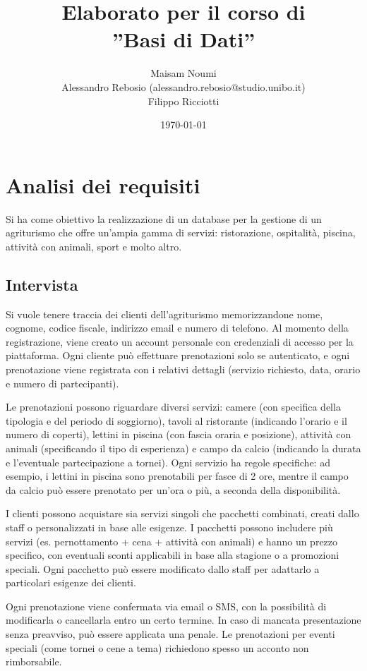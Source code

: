 \documentclass[a4paper,11pt]{report}
\title{Elaborato per il corso di\\''Basi di Dati''}
\author{
    Maisam Noumi\\
    Alessandro Rebosio (alessandro.rebosio@studio.unibo.it)\\
    Filippo Ricciotti
}
\date{\today}
\begin{document}
\maketitle

\tableofcontents

\chapter{Analisi dei requisiti}
Si ha come obiettivo la realizzazione di un database per la gestione di un agriturismo che offre un'ampia gamma di servizi: ristorazione,
ospitalità, piscina, attività con animali, sport e molto altro.

\section{Intervista}
Si vuole tenere traccia dei clienti dell'agriturismo memorizzandone nome, cognome, codice fiscale, indirizzo email e numero di telefono. Al
momento della registrazione, viene creato un account personale con credenziali di accesso per la piattaforma. Ogni cliente
può effettuare prenotazioni solo se autenticato, e ogni prenotazione viene registrata con i relativi dettagli (servizio richiesto, data,
orario e numero di partecipanti).

Le prenotazioni possono riguardare diversi servizi: camere (con specifica della tipologia e del periodo di soggiorno), tavoli al
ristorante (indicando l'orario e il numero di coperti), lettini in piscina (con fascia oraria e posizione), attività con animali
(specificando il tipo di esperienza) e campo da calcio (indicando la durata e l'eventuale partecipazione a tornei). Ogni servizio ha
regole specifiche: ad esempio, i lettini in piscina sono prenotabili per fasce di 2 ore, mentre il campo da calcio può essere prenotato
per un'ora o più, a seconda della disponibilità.

I clienti possono acquistare sia servizi singoli che pacchetti combinati, creati dallo staff o personalizzati in base alle esigenze. I pacchetti
possono includere più servizi (es. pernottamento + cena + attività con animali) e hanno un prezzo specifico, con eventuali sconti applicabili
in base alla stagione o a promozioni speciali. Ogni pacchetto può essere modificato dallo staff per adattarlo a particolari esigenze dei clienti.

Ogni prenotazione viene confermata via email o SMS, con la possibilità di modificarla o cancellarla entro un certo termine. In caso di
mancata presentazione senza preavviso, può essere applicata una penale. Le prenotazioni per eventi speciali (come tornei o cene a tema) richiedono
spesso un acconto non rimborsabile.
\end{document}

